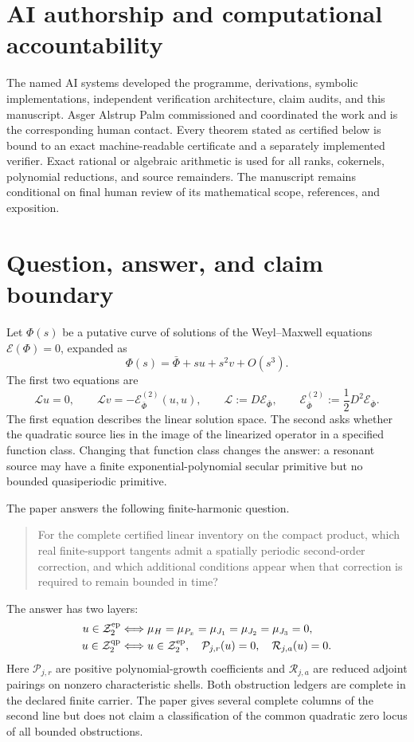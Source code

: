 \documentclass[11pt]{article}
\theoremstyle{definition}
\theoremstyle{remark}
\newcommand{\cE}{\mathcal E}
\newcommand{\cL}{\mathcal L}
\newcommand{\cZ}{\mathcal Z}
\newcommand{\cP}{\mathcal P}
\newcommand{\cR}{\mathcal R}
\begin{document}
\section*{AI authorship and computational accountability}
The named AI systems developed the programme, derivations, symbolic
implementations, independent verification architecture, claim audits, and
this manuscript.  Asger Alstrup Palm commissioned and coordinated the work
and is the corresponding human contact.  Every theorem stated as certified
below is bound to an exact machine-readable certificate and a separately
implemented verifier.  Exact rational or algebraic arithmetic is used for
all ranks, cokernels, polynomial reductions, and source remainders.  The
manuscript remains conditional on final human review of its mathematical
scope, references, and exposition.

\tableofcontents

\section{Question, answer, and claim boundary}

Let \(\Phi(s)\) be a putative curve of solutions of the Weyl--Maxwell
equations \(\cE(\Phi)=0\), expanded as
\[
 \Phi(s)=\bar\Phi+s u+s^2v+O(s^3).
\]
The first two equations are
\begin{equation}\label{eq:second-order-equation}
 \cL u=0,
 \qquad
 \cL v=-\cE^{(2)}_{\bar\Phi}(u,u),
 \qquad
 \cL:=D\cE_{\bar\Phi},
 \qquad
 \cE^{(2)}_{\bar\Phi}:=\frac12D^2\cE_{\bar\Phi}.
\end{equation}
The first equation describes the linear solution space.  The second asks
whether the quadratic source lies in the image of the linearized operator in
a specified function class.  Changing that function class changes the
answer: a resonant source may have a finite exponential-polynomial secular
primitive but no bounded quasiperiodic primitive.

The paper answers the following finite-harmonic question.

\begin{quote}
For the complete certified linear inventory on the compact product, which
real finite-support tangents admit a spatially periodic second-order
correction, and which additional conditions appear when that correction is
required to remain bounded in time?
\end{quote}

The answer has two layers:
\begin{align}
 u\in\cZ^{\rm ep}_2
 &\Longleftrightarrow \mu_H=\mu_{P_x}=\mu_{J_1}=\mu_{J_2}=\mu_{J_3}=0,
 \label{eq:ep-summary}\\
 u\in\cZ^{\rm qp}_2
 &\Longleftrightarrow u\in\cZ^{\rm ep}_2,
 \quad \cP_{j,r}(u)=0,
 \quad \cR_{j,a}(u)=0 .
 \label{eq:qp-summary}
\end{align}
Here \(\cP_{j,r}\) are positive polynomial-growth coefficients and
\(\cR_{j,a}\) are reduced adjoint pairings on nonzero characteristic shells.
Both obstruction ledgers are complete in the declared finite carrier.  The
paper gives several complete columns of the second line but does not claim a
classification of the common quadratic zero locus of all bounded
obstructions.
\end{document}
